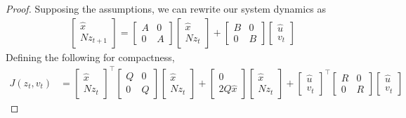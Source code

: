 \documentclass[12pt]{article}
\begin{document}
\begin{proof}
  Supposing the assumptions, we can rewrite our system dynamics as
  \begin{align}
    \begin{bmatrix} \hat{x} \\ N z_{t + 1} \end{bmatrix}
      = \begin{bmatrix} A & 0 \\ 0 & A \end{bmatrix}
        \begin{bmatrix} \hat{x} \\ N z_t \end{bmatrix}
        + \begin{bmatrix} B & 0 \\ 0 & B \end{bmatrix}
          \begin{bmatrix} \hat{u} \\ v_t \end{bmatrix}
      \label{eqn:subspace-dynamics}
  \end{align}
  Defining the following for compactness,
  \begin{align*}
    J(z_t, v_t)
      &= \begin{bmatrix} \hat{x} \\ N z_t \end{bmatrix}^\top
        \begin{bmatrix} Q & 0 \\ 0 & Q \end{bmatrix}
        \begin{bmatrix} \hat{x} \\ N z_t \end{bmatrix}
        + \begin{bmatrix} 0 \\ 2 Q \hat{x} \end{bmatrix}
          \begin{bmatrix} \hat{x} \\ N z_t \end{bmatrix}
        + \begin{bmatrix} \hat{u} \\ v_t \end{bmatrix}^\top
          \begin{bmatrix} R & 0 \\ 0 & R \end{bmatrix}
          \begin{bmatrix} \hat{u} \\ v_t \end{bmatrix}

\end{align*}
\end{proof}
\end{document}
